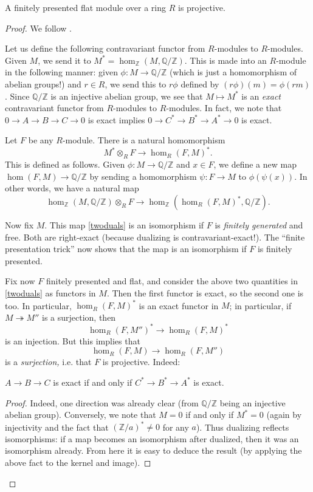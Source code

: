 \begin{theorem} \label{fpflatmeansprojective}
A finitely presented flat module over a ring $R$ is projective.
\end{theorem} 
\begin{proof} 
We follow \cite{We95}.

Let us define the following contravariant functor from $R$-modules to $R$-modules.
Given $M$, we send it to $M^* = \hom_\mathbb{Z}(M, \mathbb{Q}/\mathbb{Z})$.
This is made into an $R$-module in the following manner: given $\phi: M \to
\mathbb{Q}/\mathbb{Z}$ (which is just a homomorphism of abelian groups!) and $r
\in R$, we send this to $r\phi$ defined by $(r\phi)(m) = \phi(rm)$.
Since $\mathbb{Q}/\mathbb{Z}$ is an injective abelian group, we see that $M
\mapsto M^*$ is an \emph{exact} contravariant functor from $R$-modules to
$R$-modules.
In fact, we note that $0 \to A \to B \to C \to 0$ is exact  implies $0 \to C^* \to B^* \to A^* \to 0$ is exact.

Let $F$ be any $R$-module. There is a natural homomorphism
\begin{equation} \label{twoduals} M^* \otimes_R F \to \hom_R(F, M)^*.
\end{equation}
This is defined as follows. Given $\phi: M \to \mathbb{Q}/\mathbb{Z}$ and $x \in
F$, we define a new map $\hom(F, M) \to \mathbb{Q}/\mathbb{Z}$ by sending a
homomorphism $\psi: F \to M$ to $\phi(\psi(x))$.
In other words, we have a natural map
\[ \hom_{\mathbb{Z}}(M, \mathbb{Q}/\mathbb{Z} ) \otimes_R F \to
\hom_{\mathbb{Z}}( \hom_R(F, M)^*, \mathbb{Q}/\mathbb{Z}). \]

Now fix $M$.
This map \eqref{twoduals} is an isomorphism if $F$ is \emph{finitely
generated} and  free. 
 Both are right-exact (because dualizing is contravariant-exact!).
The ``finite presentation trick'' now shows that the map is an isomorphism if
$F$ is finitely presented.
 
Fix now $F$  finitely presented and flat, and consider the above two quantities
in \eqref{twoduals} as functors in $M$.
Then the first functor is exact, so the second one is too.
In particular, $\hom_R(F, M)^*$ is an exact functor in $M$; in particular, if
$M \twoheadrightarrow M''$ is a surjection, then 
\[ \hom_R(F, M'')^* \to \hom_R(F, M)^*  \]
is an injection. But this implies that
\[ \hom_R(F, M) \to \hom_R(F, M'')  \]
is a \emph{surjection,} i.e. that $F$ is projective.
Indeed:
\begin{lemma} $ A \to B \to C $ is exact if and only if $C^* \to B^* \to A^* $ is exact.
\end{lemma} 
\begin{proof} 
Indeed, one direction was already clear (from $\mathbb{Q}/\mathbb{Z}$ being an
injective abelian group). 
Conversely, we note that $M = 0$ if and only if $M^* = 0$ (again by
injectivity and the fact that $(\mathbb{Z}/a)^* \neq 0$ for any $a$).
Thus dualizing reflects isomorphisms: if a map becomes an isomorphism after
dualized, then it was an isomorphism already. From here it is easy to deduce
the result (by applying the above fact to the kernel and image).
\end{proof} 
\end{proof} 
